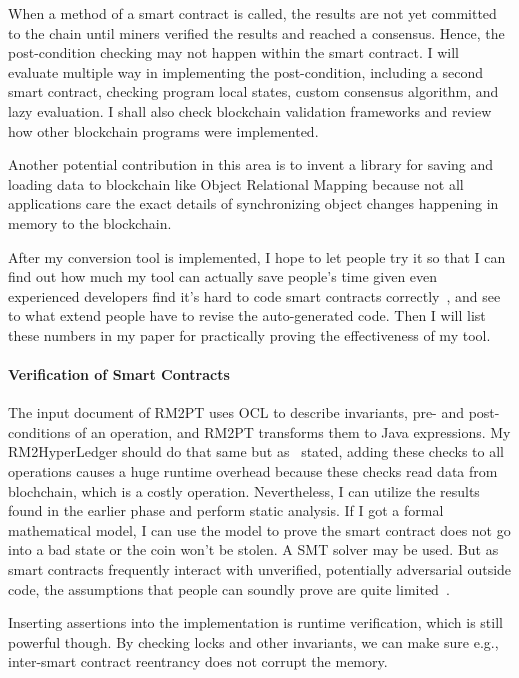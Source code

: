 When a method of a smart contract is called, the results are not yet committed to the chain until miners verified the results and reached a consensus. Hence, the post-condition checking may not happen within the smart contract. I will evaluate multiple way in implementing the post-condition, including a second smart contract, checking program local states, custom consensus algorithm, and lazy evaluation.
I shall also check blockchain validation frameworks and review how other blockchain programs were implemented.

Another potential contribution in this area is to invent a library for saving and loading data to blockchain like Object Relational Mapping because
not all applications care the exact details of synchronizing object changes happening in memory to the blockchain.

After my conversion tool is implemented, I hope to let people try it so that I can find out how much my tool can actually save people's time given even experienced developers find it's hard to code smart contracts correctly~\cite{dao2019challenges}, and see to what extend people have to revise the auto-generated code. Then I will list these numbers in my paper for practically proving the effectiveness of my tool.



\paragraph*{Verification of Smart Contracts}
The input document of RM2PT uses OCL to describe invariants, pre- and post-conditions of an operation, and RM2PT transforms them to Java expressions.
My RM2HyperLedger should do that same but as~\cite{li2020securing} stated, adding these checks to all operations causes a huge runtime overhead because these checks read data from blochchain, which is a costly operation.
Nevertheless, I can utilize the results found in the earlier phase and perform static analysis.
If I got a formal mathematical model, I can use the model to prove the smart contract does not go into a bad state or the coin won't be stolen.
A SMT solver may be used.
But as smart contracts frequently interact with unverified, potentially adversarial outside code,
the assumptions that people can soundly prove are quite limited~\cite{bram2021rich}.

Inserting assertions into the implementation is runtime verification, which is still powerful though.
By checking locks and other invariants, we can make sure e.g., inter-smart contract reentrancy does not corrupt the memory.


